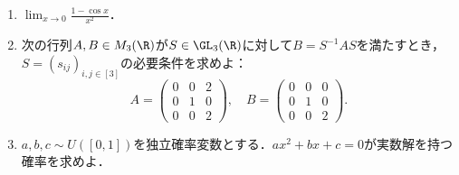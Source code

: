 \documentclass[uplatex,dvipdfmx]{jsarticle}
\begin{document}
\begin{tcolorbox}[colframe=ForestGreen, colback=ForestGreen!10!white,breakable,colbacktitle=ForestGreen!40!white,coltitle=black,fonttitle=\bfseries\sffamily,
title=第１問]
    \begin{enumerate}
        \item $\lim_{x\to 0}\frac{1-\cos x}{x^2}$．
        \item 次の行列$A,B\in M_3(\R)$が$S\in\GL_3(\R)$に対して$B=S^{-1}AS$を満たすとき，$S=(s_{ij})_{i,j\in[3]}$の必要条件を求めよ：
        \[A=\begin{pmatrix}
            0&0&2\\0&1&0\\0&0&2
        \end{pmatrix},\quad B=\begin{pmatrix}0&0&0\\0&1&0\\0&0&2\end{pmatrix}.\]
        \item $a,b,c\sim U([0,1])$を独立確率変数とする．$ax^2+bx+c=0$が実数解を持つ確率を求めよ．
    \end{enumerate}
\end{tcolorbox}
\end{document}
